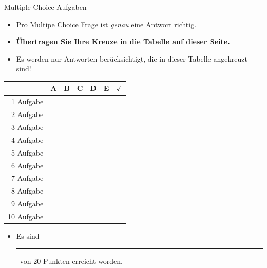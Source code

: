 \documentclass[a4paper, 9pt]{scrartcl}\usepackage[]{graphicx}\usepackage[]{xcolor}
\begin{document}
\begin{graybox}{Multiple Choice Aufgaben}
  \begin{itemize}
  \item Pro Multipe Choice Frage ist \emph{genau} eine Antwort richtig.
  \item \textbf{Übertragen Sie Ihre Kreuze in die Tabelle auf
      dieser Seite.}
  \item Es werden nur Antworten berücksichtigt, die in dieser Tabelle
    angekreuzt sind!
  \end{itemize}

\begin{center}
  \large
  \begin{tabular}{|r|c|c|c|c|c||c|}
    \hline
    & \textbf{A} & \textbf{B} & \textbf{C} & \textbf{D} & \textbf{E} & $\boldsymbol{\checkmark}$\strut\\
    \hline
    1 Aufgabe &   &   &   &   &   & \strut\\
    \hline
    2 Aufgabe &   &   &   &   &   & \strut\\
    \hline
    3 Aufgabe &   &   &   &   &   & \strut\\
    \hline
    4 Aufgabe &   &   &   &   &   & \strut\\
    \hline
    5 Aufgabe &   &   &   &   &   & \strut\\
    \hline
    6 Aufgabe &   &   &   &   &   & \strut\\
    \hline
    7 Aufgabe &   &   &   &   &   & \strut\\
    \hline
    8 Aufgabe &   &   &   &   &   & \strut\\
    \hline
    9 Aufgabe &   &   &   &   &   & \strut\\
    \hline
    10 Aufgabe &   &   &   &   &   & \strut\\
    \hline
  \end{tabular}
\end{center}

\begin{itemize}
\item Es sind \rule[0ex]{2em}{.4pt}\, von 20 Punkten erreicht worden.
\end{itemize}
\end{graybox}

\vfill
\end{document}
